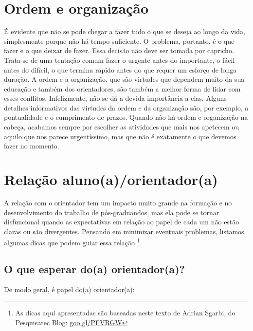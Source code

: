 \documentclass[twoside a4paper 12pt]{report}
\begin{document}
\section{Ordem e organização}

É evidente que não se pode chegar a fazer tudo o que se deseja ao
longo da vida, simplesmente porque não há tempo suficiente. O
problema, portanto, é o que fazer e o que deixar de fazer. Essa
decisão não deve ser tomada por capricho. Trata-se de uma tentação
comum fazer o urgente antes do importante, o fácil antes do difícil, o
que termina rápido antes do que requer um esforço de longa duração. A
ordem e a organização, que são virtudes que dependem muito da sua
educação e também dos orientadores, são também a melhor forma de lidar
com esses conflitos. Infelizmente, não se dá a devida importância a
elas. Alguns detalhes informativos das virtudes da ordem e da
organização são, por exemplo, a pontualidade e o cumprimento de
prazos. Quando não há ordem e organização na cabeça, acabamos sempre
por escolher as atividades que mais nos apetecem ou aquilo que nos
parece urgentíssimo, mas que não é exatamente o que devemos fazer no
momento.

\section{Relação aluno(a)/orientador(a)}

A relação com o orientador tem um impacto muito grande na formação e
no desenvolvimento do trabalho de pós-graduandos, mas ela pode se
tornar disfuncional quando as expectativas em relação ao papel de cada
um não estão claras ou são divergentes. Pensando em minimizar
eventuais problemas, listamos algumas dicas que podem guiar essa
relação \footnote{As dicas aqui apresentadas são baseadas neste texto
  de Adrian Sgarbi, do Pesquisatec Blog: {\url{goo.gl/PFVRGW}}}.

\subsection{O que esperar do(a) orientador(a)?}

	De modo geral, é papel do(a) orientador(a):
	
\end{document}
